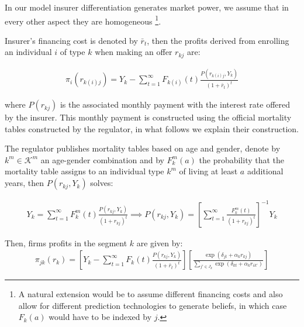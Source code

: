 \documentclass[12pt]{article}
\theoremstyle{plain}
\theoremstyle{plain}
\begin{document}
In our model insurer differentiation generates market power, we assume that in every other aspect they are homogeneous \footnote{A natural extension would be to assume different financing costs and also allow for different prediction technologies to generate beliefs, in which case $F_k(a)$ would have to be indexed by $j$. }.

Insurer's financing cost is denoted by $\bar{r}_t$, then the profits derived from enrolling an individual $i$ of type $k$ when making an offer $r_{kj}$ are: 

\begin{align}\label{eq:individual_profits}
    \pi_{i}(r_{k(i)j}) =
    Y_k -   \sum_{t=1}^{\infty} F_{k(i)}(t) \frac{P(r_{k(i)j},Y_k)}{(1+\bar{r}_t)^t} 
\end{align}

where $P(r_{kj})$ is the associated monthly payment with the interest rate offered by the insurer. This monthly payment is constructed using the official mortality tables constructed by the regulator, in what follows we explain their construction. 

The regulator publishes mortality tables based on age and gender, denote by $k^m \in \mathcal{K}^m$ an age-gender combination and by $F_k^m(a)$ the probability that the mortality table assigns to an individual type $k^m$ of living at least $a$ additional years, then $P(r_{kj},Y_k)$ solves:

\begin{align}
    Y_k = \sum_{t=1}^{\infty} F_k^m(t) \frac{P(r_{kj},Y_k)}{(1+r_{kj})^t} \implies  P(r_{kj},Y_k) = \left[\sum_{t=1}^{\infty}  \frac{F_k^m(t)}{(1+r_{kj})^t} \right]^{-1} Y_k
\end{align}





Then, firms profits in the segment $k$ are given by: 
\begin{align}
    \pi_{jk}( r_k) = \left[Y_k -   \sum_{t=1}^{\infty} F_k(t) \frac{P(r_{kj},Y_k)}{(1+\bar{r}_t)^t} \right] \left[\frac{\exp(\delta_{jt} + \alpha_{k}r_{kj})}{\sum_{j'\in J_k}\exp(\delta_{kt} + \alpha_kr_{ik'})}\right]
\end{align}
\end{document}
